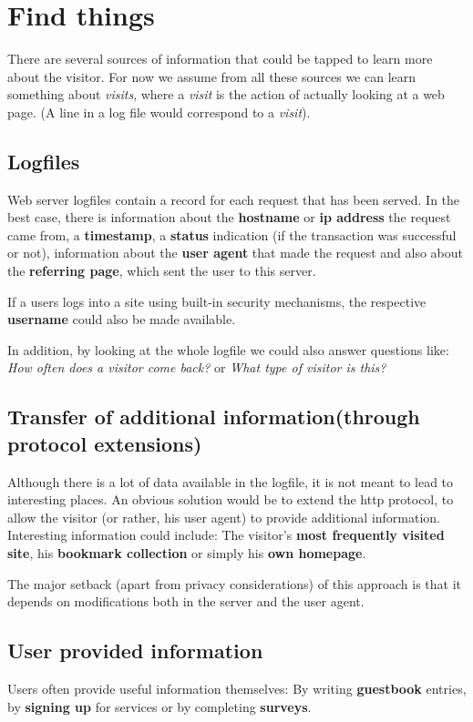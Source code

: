 \documentclass[a4paper]{danarticle}
\begin{document}
  \section*{Find things}
    There are several sources of information that could be tapped to learn more
    about the visitor. For now we assume from all these sources we can learn
    something about \textit{visits}, where a \textit{visit} is the action of
    actually looking at a web page. (A line in a log file would correspond to 
    a \textit{visit}).
    \subsection*{Logfiles}
      Web server logfiles contain a record for each request that has been
      served. In the best case, there is information about the \textbf{hostname}
      or \textbf{ip address} the request came from, a \textbf{timestamp}, a
      \textbf{status} indication (if the transaction was successful or not),
      information about the \textbf{user agent} that made the request and also
      about the \textbf{referring page}, which sent the user to this server.
      
      If a users logs into a site using built-in security mechanisms, the
      respective \textbf{username} could also be made available.
      
      In addition, by looking at the whole logfile we could also answer
      questions like: \textit{How often does a visitor come back?} or \textit{What
      type of visitor is this?}
    \subsection*{Transfer of additional information(through protocol extensions)}
      Although there is a lot of data available in the logfile, it is not meant
      to lead to interesting places. An obvious solution would be to extend the
      http protocol, to allow the visitor (or rather, his user agent) to provide
      additional information. Interesting information could include: The
      visitor's \textbf{most frequently visited site}, his \textbf{bookmark
      collection} or simply his \textbf{own homepage}. 
      
      The major setback (apart from privacy considerations) of this approach is
      that it depends on modifications both in the server and the user agent.
    \subsection*{User provided information} 
      Users often provide useful information themselves: By writing
      \textbf{guestbook} entries, by \textbf{signing up} for services or by completing
      \textbf{surveys}.
\end{document}
